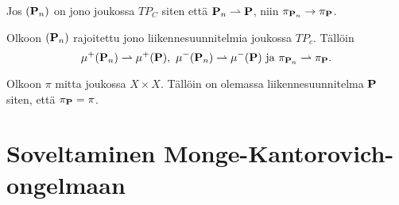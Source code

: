 \begin{theorem}
    Jos $(\P_n)$ on jono joukossa $TP_C$ siten että $\P_n \rightharpoonup \P$, niin $\pi_{\P_n} \to \pi_\P$.
\end{theorem}

\begin{theorem}
Olkoon $(\P_n)$ rajoitettu jono liikennesuunnitelmia joukossa $TP_c$. Tällöin
\begin{equation*}
    \mu^+(\P_n) \rightharpoonup \mu^+(\P), \ \mu^-(\P_n) \rightharpoonup \mu^-(\P) \text{ ja } \pi_{\P_n} \rightharpoonup \pi_\P.
\end{equation*}
\end{theorem}

\begin{corollary}
    Olkoon $\pi$ mitta joukossa $X \times X$. Tällöin on olemassa liikennesuunnitelma $\P$ siten, että $\pi_\P = \pi$.
\end{corollary}

\section{Soveltaminen Monge-Kantorovich-ongelmaan}
